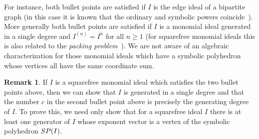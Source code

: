 \documentclass[12pt, reqno]{amsart}
\numberwithin{equation}{section}
\newcommand{\SP}{{\rm SP}}
\theoremstyle{plain} %
\theoremstyle{definition}
\newtheorem{rem}[thm]{Remark}
\theoremstyle{remark}
\begin{document}
For instance, both bullet points are satisfied if $I$ is the edge ideal of a bipartite graph (in this case it is known that the ordinary and symbolic powers coincide~\cite{GVV05}).  More generally both bullet points are satisfied if $I$ is a monomial ideal generated in a single degree and $I^{(n)}=\overline{I^n}$ for all $n\ge 1$ (for squarefree monomial ideals this is also related to the \textit{packing problem}~\cite{DDSGHN2018}).  We are not aware of an algebraic characterization for those monomial ideals which have a symbolic polyhedron whose vertices all have the same coordinate sum.

\begin{rem}
If $I$ is a squarefree monomial ideal which satisfies the two bullet points above, then we can show that $I$ is generated in a single degree and that the number $c$ in the second bullet point above is precisely the generating degree of $I$.  To prove this, we need only show that for a squarefree ideal $I$ there is at least one generator of $I$ whose exponent vector is a vertex of the symbolic polyhedron $\SP(I)$.


\end{rem}
\end{document}
